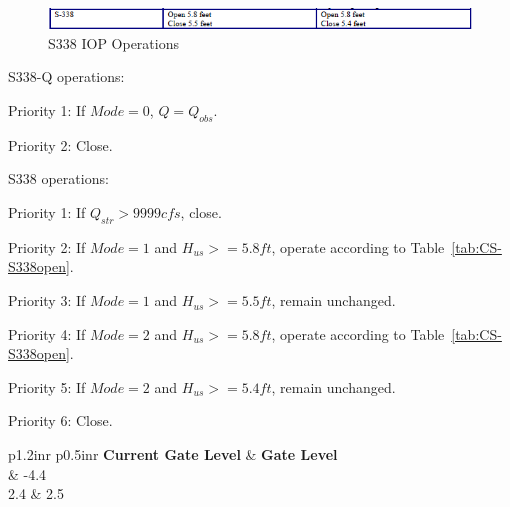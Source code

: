\begin{figure}[!h]
  \begin{center}
  \includegraphics[width=6.5in]{../figs/S338_IOPops.png}
  \caption{S338 IOP Operations}
  \label{fig:S338iop}
  \end{center}
\end{figure}

S338-Q operations:
\begin{packed_items}
\item Priority 1: If $Mode=0$, $Q = Q_{obs}$.
\item Priority 2: Close.
\end{packed_items}


S338 operations:
\begin{packed_items}
\item Priority 1: If $Q_{str}>9999 cfs$, close.
\item[]
\item Priority 2: If $Mode=1$ and $H_{us}>=5.8 ft$, operate according to Table~\ref{tab:CS-S338open}.
\item Priority 3: If $Mode=1$ and $H_{us}>=5.5 ft$, remain unchanged.
\item[]
\item Priority 4: If $Mode=2$ and $H_{us}>=5.8 ft$, operate according to Table~\ref{tab:CS-S338open}.
\item Priority 5: If $Mode=2$ and $H_{us}>=5.4 ft$, remain unchanged.
\item[]
\item Priority 6: Close.
\end{packed_items}

\footnotesize
\begin{table}[!h]
\centering
\caption{Control strategy for S338 open (units are ft. NGVD29)}
\label{tab:CS-S338open}
\begin{tabular}{p{1.2in}{r} p{0.5in}{r}}
\hline
\textbf{Current Gate Level} & \textbf{Gate Level}\\
	& -4.4       \\
2.4	& 2.5   \\
\hline
\end{tabular}
\end{table}
\normalsize


